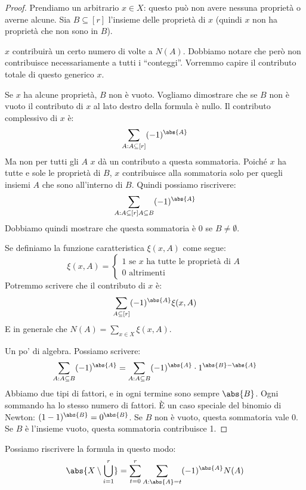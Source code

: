\begin{proof}
	Prendiamo un arbitrario $x \in X$: questo pu\`o non avere nessuna propriet\`a o averne alcune.
	Sia $B \subseteq [r]$ l'insieme delle propriet\`a di $x$ (quindi $x$ non ha propriet\`a che non sono in $B$).

	$x$ contribuir\`a un certo numero di volte a $N(A)$.
	Dobbiamo notare che per\`o non contribuisce necessariamente a tutti i ``conteggi''.
	Vorremmo capire il contributo totale di questo generico $x$.

	Se $x$ ha alcune propriet\`a, $B$ non \`e vuoto.
	Vogliamo dimostrare che se $B$ non \`e vuoto il contributo di $x$ al lato destro della formula \`e nullo.
	Il contributo complessivo di $x$ \`e:
	\[
		\sum_{A : A \subseteq [r]} (-1)^{\abs{A}}
	\]
	Ma non per tutti gli $A$ $x$ d\`a un contributo a questa sommatoria.
	Poich\'e $x$ ha tutte e sole le propriet\`a di $B$, $x$ contribuisce alla sommatoria solo per quegli insiemi $A$ che sono all'interno di $B$.
	Quindi possiamo riscrivere:
	\[
		\sum_{A : A \subseteq [r] \\ A \subseteq B} (-1)^{\abs{A}}
	\]
	Dobbiamo quindi mostrare che questa sommatoria \`e 0 se $B \neq \emptyset$.

	Se definiamo la funzione caratteristica $\xi(x,A)$ come segue:
	\[
		\xi(x,A) =
		\begin{cases}
			1 \text{ se } x \text{ ha tutte le propriet\`a di } A \\
			0 \text{ altrimenti}
		\end{cases}
	\]
	Potremmo scrivere che il contributo di $x$ \`e:
	\[
		\sum_{A \subseteq [r]} (-1)^{\abs{A}} \xi(x,A)
	\]
	E in generale che $N(A) = \sum_{x \in X} \xi(x,A)$.

	Un po' di algebra.
	Possiamo scrivere:
	\[
		\sum_{A: A \subseteq B} (-1)^{\abs{A}} =
		\sum_{A : A \subseteq B} (-1)^{\abs{A}} \cdot 1^{\abs{B} - \abs{A}}
	\]
	Abbiamo due tipi di fattori, e in ogni termine sono sempre $\abs{B}$.
	Ogni sommando ha lo stesso numero di fattori.
	\`E un caso speciale del binomio di Newton: $(1-1)^{\abs{B}} = 0^{\abs{B}}$.
	Se $B$ non \`e vuoto, questa sommatoria vale 0.
	Se $B$ \`e l'insieme vuoto, questa sommatoria contribuisce 1.
\end{proof}

\begin{oss}
	Possiamo riscrivere la formula in questo modo:
	\[
		\abs{X \setminus \bigcup_{i=1}^{r}} =
		\sum_{t = 0}^{r} \sum_{A : \abs{A} = t} (-1)^{\abs{A}} N(A)
	\]
\end{oss}

